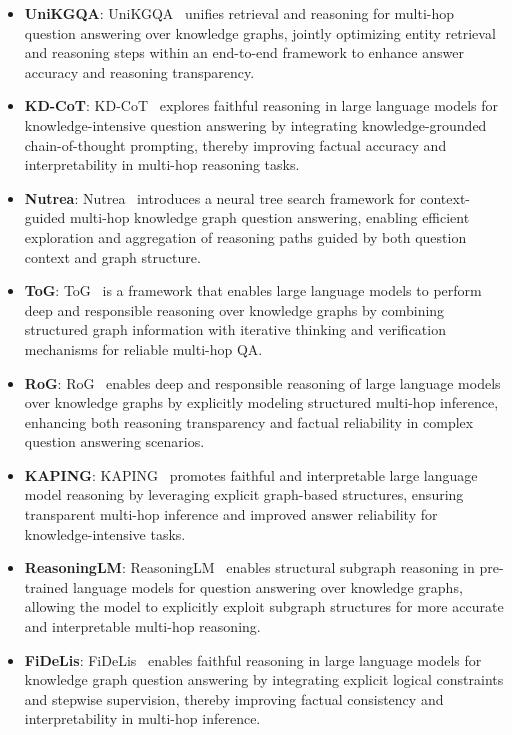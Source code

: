 \begin{itemize}
\begin{itemize}
    \item  \textbf{UniKGQA}: UniKGQA~\cite{jiang2022unikgqa} unifies retrieval and reasoning for multi-hop question answering over knowledge graphs, jointly optimizing entity retrieval and reasoning steps within an end-to-end framework to enhance answer accuracy and reasoning transparency.
    \item \textbf{KD-CoT}: KD-CoT~\cite{wang2023knowledge} explores faithful reasoning in large language models for knowledge-intensive question answering by integrating knowledge-grounded chain-of-thought prompting, thereby improving factual accuracy and interpretability in multi-hop reasoning tasks.
    \item \textbf{Nutrea}: Nutrea~\cite{choi2023nutrea} introduces a neural tree search framework for context-guided multi-hop knowledge graph question answering, enabling efficient exploration and aggregation of reasoning paths guided by both question context and graph structure.
    \item \textbf{ToG}: ToG~\cite{sun2023think} is a framework that enables large language models to perform deep and responsible reasoning over knowledge graphs by combining structured graph information with iterative thinking and verification mechanisms for reliable multi-hop QA.
    \item \textbf{RoG}: RoG~\cite{luo2023reasoning} enables deep and responsible reasoning of large language models over knowledge graphs by explicitly modeling structured multi-hop inference, enhancing both reasoning transparency and factual reliability in complex question answering scenarios.
    \item \textbf{KAPING}: KAPING~\cite{baek2023knowledge} promotes faithful and interpretable large language model reasoning by leveraging explicit graph-based structures, ensuring transparent multi-hop inference and improved answer reliability for knowledge-intensive tasks.
    \item \textbf{ReasoningLM}: ReasoningLM~\cite{jiang2023reasoninglm} enables structural subgraph reasoning in pre-trained language models for question answering over knowledge graphs, allowing the model to explicitly exploit subgraph structures for more accurate and interpretable multi-hop reasoning.
    \item \textbf{FiDeLis}: FiDeLis~\cite{sui2024fidelis} enables faithful reasoning in large language models for knowledge graph question answering by integrating explicit logical constraints and stepwise supervision, thereby improving factual consistency and interpretability in multi-hop inference.
    

\end{itemize}
\end{itemize}
